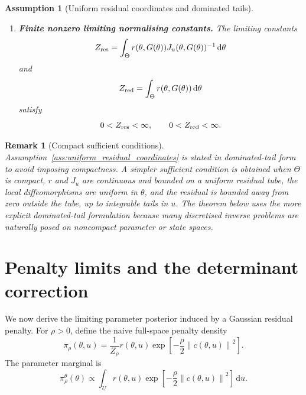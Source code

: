 \documentclass[11pt]{article}
\newtheorem{assumption}{Assumption}
\newtheorem{remark}{Remark}
\newcommand{\dd}{\,\mathrm{d}}
\newcommand{\norm}[1]{\left\lVert #1\right\rVert}
\begin{document}
\begin{assumption}[Uniform residual coordinates and dominated tails]
\begin{enumerate}[leftmargin=*]
 \item \textbf{Finite nonzero limiting normalising constants.}
 The limiting constants
 \begin{equation}
  Z_{\rm res}
   =
  \int_\Theta
  r(\theta,G(\theta))
  J_u(\theta,G(\theta))^{-1}
  \dd\theta
  \label{eq:Z_res_explicit}
 \end{equation}
 and
 \begin{equation}
  Z_{\rm red}
  =
  \int_\Theta
  r(\theta,G(\theta))
  \dd\theta
  \label{eq:Z_red_explicit}
 \end{equation}
 satisfy
 \[
  0<Z_{\rm res}<\infty,
  \qquad
  0<Z_{\rm red}<\infty.
 \]
\end{enumerate}
\end{assumption}

\begin{remark}[Compact sufficient conditions]
Assumption~\ref{ass:uniform_residual_coordinates} is stated in dominated-tail form to avoid imposing compactness. A simpler sufficient condition is obtained when \(\Theta\) is compact, \(r\) and \(J_u\) are continuous and bounded on a uniform residual tube, the local diffeomorphisms are uniform in \(\theta\), and the residual is bounded away from zero outside the tube, up to integrable tails in \(u\). The theorem below uses the more explicit dominated-tail formulation because many discretised inverse problems are naturally posed on noncompact parameter or state spaces.
\end{remark}

\section{Penalty limits and the determinant correction}
\label{sec:penalty}

We now derive the limiting parameter posterior induced by a Gaussian residual penalty. For \(\rho>0\), define the naive full-space penalty density
\begin{equation}
 \pi_\rho(\theta,u)
 =
 \frac{1}{Z_\rho}
 r(\theta,u)
 \exp\!\left[-\frac{\rho}{2}\norm{c(\theta,u)}^2\right].
 \label{eq:pi_rho}
\end{equation}
The parameter marginal is
\begin{equation}
 \pi^\theta_\rho(\theta)
 \propto
 \int_U r(\theta,u)
 \exp\!\left[-\frac{\rho}{2}\norm{c(\theta,u)}^2\right]\dd u.
 \label{eq:theta_marginal_penalty}
\end{equation}
\end{document}
